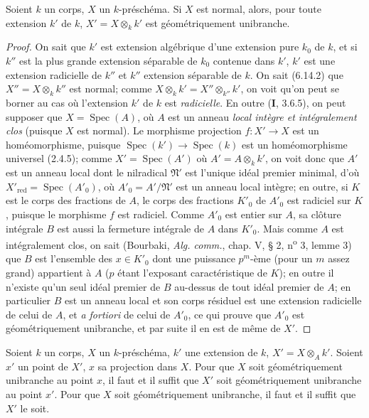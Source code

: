 \begin{proposition}[6.15.6]
\label{IV.2.s6.15.6-fr}
Soient $k$ un corps, $X$ un $k$-préschéma. Si $X$ est normal, alors, pour
toute extension $k'$ de $k$, $X'=X\otimes_k k'$ est géométriquement
unibranche.
\end{proposition}

\begin{proof}
On sait que $k'$ est extension algébrique d'une extension pure $k_0$ de
$k$, et si $k''$ est la plus grande extension séparable de $k_0$ contenue
dans $k'$, $k'$ est une extension radicielle de $k''$ et $k''$ extension
séparable de $k$. On sait (6.14.2) que $X''=X\otimes_k k''$ est normal;
comme $X\otimes_k k'=X''\otimes_{k''}k'$, on voit qu'on peut se borner au
cas où l'extension $k'$ de $k$ est \emph{radicielle}. En outre (\textbf{I}, 3.6.5), on peut
supposer que $X=\operatorname{Spec}(A)$, où $A$ est un anneau \emph{local intègre
et intégralement clos} (puisque $X$ est normal). Le morphisme projection
$f:X'\to X$ est un homéomorphisme, puisque
$\operatorname{Spec}(k')\to\operatorname{Spec}(k)$ est un homéomorphisme
universel (2.4.5); comme $X'=\operatorname{Spec}(A')$ où
$A'=A\otimes_k k'$, on voit donc que $A'$ est un anneau local dont le
nilradical $\mathfrak N'$ est l'unique idéal premier minimal, d'où
$X'_{\mathrm{red}}=\operatorname{Spec}(A'_0)$, où
$A'_0=A'/\mathfrak N'$ est un anneau local intègre; en outre, si $K$ est
le corps des fractions de $A$, le corps des fractions $K'_0$ de $A'_0$ est
radiciel sur $K$, puisque le morphisme $f$ est radiciel. Comme $A'_0$ est
entier sur $A$, sa clôture intégrale $B$ est aussi la fermeture intégrale
de $A$ dans $K'_0$. Mais comme $A$ est intégralement clos, on sait
(Bourbaki, \emph{Alg. comm.}, chap. V, § 2, n\textsuperscript{o} 3, lemme 3) que $B$ est
l'ensemble des $x\in K'_0$ dont une puissance $p^m$-ème (pour un $m$ assez
grand) appartient à $A$ ($p$ étant l'exposant caractéristique de $K$);
en outre il n'existe qu'un seul idéal premier de $B$ au-dessus de tout idéal
premier de $A$; en particulier $B$ est un anneau local et son corps résiduel
est une extension radicielle de celui de $A$, et \emph{a fortiori} de celui de
$A'_0$, ce qui prouve que $A'_0$ est géométriquement unibranche, et par
suite il en est de même de $X'$.
\end{proof}

\begin{proposition}[6.15.7]
Soient $k$ un corps, $X$ un $k$-préschéma, $k'$ une extension de $k$,
$X'=X\otimes_A k'$. Soient $x'$ un point de $X'$, $x$ sa projection dans
$X$. Pour que $X$ soit géométriquement unibranche au point $x$, il faut et
il suffit que $X'$ soit géométriquement unibranche au point $x'$. Pour que
$X$ soit géométriquement unibranche, il faut et il suffit que $X'$ le soit.
\end{proposition}

